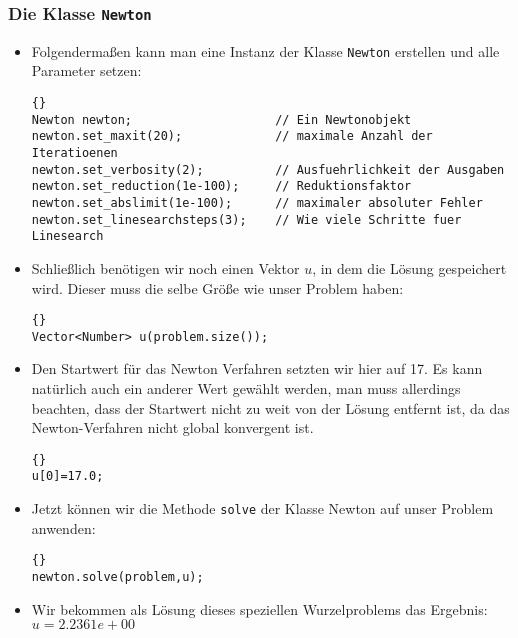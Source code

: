 \documentclass[a4paper,11pt]{article}
\theoremstyle{definition}
\begin{document}
\subsubsection{Die Klasse \lstinline{Newton}}
\begin{itemize}
\item Folgendermaßen kann man eine Instanz der Klasse
  \lstinline{Newton} erstellen und alle Parameter setzen:

    {\footnotesize{\begin{lstlisting}{}
Newton newton;                    // Ein Newtonobjekt
newton.set_maxit(20);             // maximale Anzahl der Iteratioenen
newton.set_verbosity(2);          // Ausfuehrlichkeit der Ausgaben
newton.set_reduction(1e-100);     // Reduktionsfaktor
newton.set_abslimit(1e-100);      // maximaler absoluter Fehler
newton.set_linesearchsteps(3);    // Wie viele Schritte fuer Linesearch
\end{lstlisting}}}

\item Schließlich benötigen wir noch einen Vektor $u$, in dem die
  Lösung gespeichert wird. Dieser muss die selbe Größe wie unser
  Problem haben:

  {\footnotesize{\begin{lstlisting}{}
Vector<Number> u(problem.size());
\end{lstlisting}}}

\item Den Startwert für das Newton Verfahren setzten wir hier auf
  17. Es kann natürlich auch ein anderer Wert gewählt werden, man muss
  allerdings beachten, dass der Startwert nicht zu weit von der Lösung
  entfernt ist, da das Newton-Verfahren nicht global konvergent ist.

  {\footnotesize{\begin{lstlisting}{}
u[0]=17.0;
\end{lstlisting}}}

\item Jetzt können wir die Methode \lstinline{solve} der Klasse Newton
  auf unser Problem anwenden:

  {\footnotesize{\begin{lstlisting}{}
newton.solve(problem,u);
\end{lstlisting}}}

\item Wir bekommen als Lösung dieses speziellen Wurzelproblems das Ergebnis:\\
  $u= 2.2361e+00$
\end{itemize}
\end{document}
